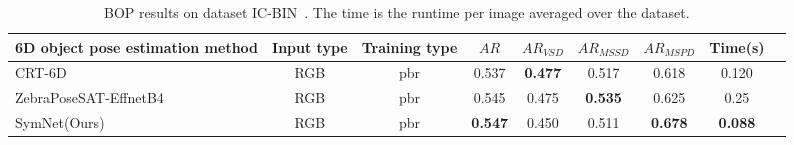 \begin{sidewaystable}[t]
        \centering
        \caption{
                BOP results on dataset IC-BIN~\cite{icbin}. The time is the runtime per image averaged over the dataset.
        }
        \begin{tabular}{l c c c c c c c c}
        \toprule
        6D object pose estimation method &Input type&Training type&$AR$&$AR_{VSD}$&$AR_{MSSD}$&$AR_{MSPD}$&Time(s)\\
        \midrule
        CRT-6D~\cite{castro2023crt}&RGB&pbr&0.537&\textbf{0.477}&0.517&0.618&0.120 \\
        ZebraPoseSAT-EffnetB4~\cite{su2022zebrapose}&RGB&pbr&0.545&0.475&\textbf{0.535}&0.625&0.25 \\
        SymNet(Ours)&RGB&pbr&\textbf{0.547}&0.450&0.511&\textbf{0.678}&\textbf{0.088} \\
        \bottomrule
        \end{tabular}
\label{tab:icbin_bop}
\end{sidewaystable}

